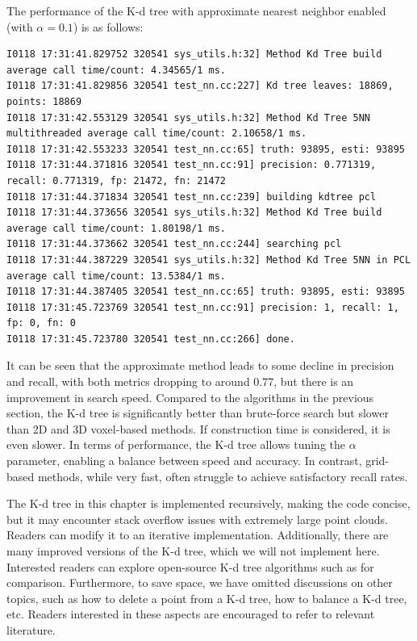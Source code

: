 The performance of the K-d tree with approximate nearest neighbor enabled (with $\alpha=0.1$) is as follows:  
\begin{lstlisting}[caption=Terminal output:]  
I0118 17:31:41.829752 320541 sys_utils.h:32] Method Kd Tree build average call time/count: 4.34565/1 ms.  
I0118 17:31:41.829856 320541 test_nn.cc:227] Kd tree leaves: 18869, points: 18869  
I0118 17:31:42.553129 320541 sys_utils.h:32] Method Kd Tree 5NN multithreaded average call time/count: 2.10658/1 ms.  
I0118 17:31:42.553233 320541 test_nn.cc:65] truth: 93895, esti: 93895  
I0118 17:31:44.371816 320541 test_nn.cc:91] precision: 0.771319, recall: 0.771319, fp: 21472, fn: 21472  
I0118 17:31:44.371834 320541 test_nn.cc:239] building kdtree pcl  
I0118 17:31:44.373656 320541 sys_utils.h:32] Method Kd Tree build average call time/count: 1.80198/1 ms.  
I0118 17:31:44.373662 320541 test_nn.cc:244] searching pcl  
I0118 17:31:44.387229 320541 sys_utils.h:32] Method Kd Tree 5NN in PCL average call time/count: 13.5384/1 ms.  
I0118 17:31:44.387405 320541 test_nn.cc:65] truth: 93895, esti: 93895  
I0118 17:31:45.723769 320541 test_nn.cc:91] precision: 1, recall: 1, fp: 0, fn: 0  
I0118 17:31:45.723780 320541 test_nn.cc:266] done.  
\end{lstlisting}  

It can be seen that the approximate method leads to some decline in precision and recall, with both metrics dropping to around 0.77, but there is an improvement in search speed. Compared to the algorithms in the previous section, the K-d tree is significantly better than brute-force search but slower than 2D and 3D voxel-based methods. If construction time is considered, it is even slower. In terms of performance, the K-d tree allows tuning the $\alpha$ parameter, enabling a balance between speed and accuracy. In contrast, grid-based methods, while very fast, often struggle to achieve satisfactory recall rates.  

The K-d tree in this chapter is implemented recursively, making the code concise, but it may encounter stack overflow issues with extremely large point clouds. Readers can modify it to an iterative implementation. Additionally, there are many improved versions of the K-d tree, which we will not implement here. Interested readers can explore open-source K-d tree algorithms such as \cite{Cai2021} for comparison. Furthermore, to save space, we have omitted discussions on other topics, such as how to delete a point from a K-d tree, how to balance a K-d tree, etc. Readers interested in these aspects are encouraged to refer to relevant literature.

